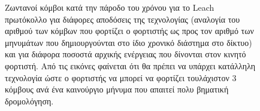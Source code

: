 \begin{figure}[H]
  \centering
  \caption{Ζωντανοί κόμβοι κατά την πάροδο του χρόνου για το Leach πρωτόκολλο για διάφορες αποδόσεις της τεχνολογίας (αναλογία του αριθμού των κόμβων που φορτίζει
ο φορτιστής ως προς τον αριθμό των μηνυμάτων που δημιουργούνται στο ίδιο χρονικό διάστημα στο δίκτυο) και για διάφορα ποσοστά αρχικής ενέργειας που δίνονται στον
κινητό φορτιστή. Από τις εικόνες φαίνεται ότι θα πρέπει να υπάρχει κατάλληλη τεχνολογία ώστε ο φορτιστής να μπορεί να φορτίζει τουλάχιστον 3 κόμβους ανά ένα
καινούργιο μήνυμα που απαιτεί πολυ βηματική δρομολόγηση.}
  \label{fig:5exp_1_2}
\end{figure}



